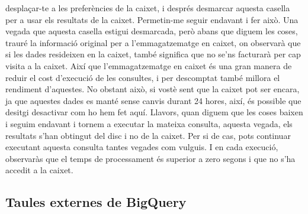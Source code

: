\documentclass[12pt,longbibliography]{article}
\theoremstyle{definition}
\theoremstyle{remark}
\begin{document}
desplaçar-te a les preferències de la caixet, i després desmarcar aquesta casella per a usar els resultats de la caixet. Permetin-me seguir endavant i fer això. Una vegada que aquesta casella estigui desmarcada, però abans que diguem les coses, trauré la informació original per a l'emmagatzematge en caixet, on observarà que si les dades resideixen en la caixet, també significa que no se'ns facturarà per cap visita a la caixet. Així que l'emmagatzematge en caixet és una gran manera de reduir el cost d'execució de les consultes, i per descomptat també millora el rendiment d'aquestes. No obstant això, si vostè sent que la caixet pot ser encara, ja que aquestes dades es manté sense canvis durant 24 hores, així, és possible que desitgi desactivar com ho hem fet aquí. Llavors, quan diguem que les coses baixen i seguim endavant i tornem a executar la mateixa consulta, aquesta vegada, els resultats s'han obtingut del disc i no de la caixet. Per si de cas, pots continuar executant aquesta consulta tantes vegades com vulguis. I en cada execució, observaràs que el temps de processament és superior a zero segons i que no s'ha accedit a la caixet.

\subsection{Taules externes de BigQuery}
\end{document}
